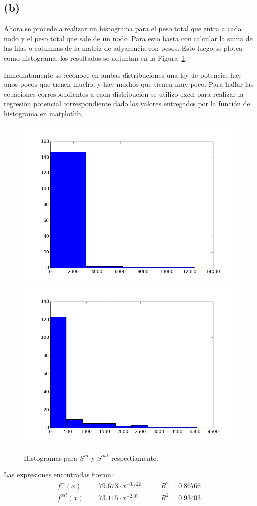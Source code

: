 \documentclass[letterpaper]{article}
\begin{document}
\subsection*{(b)}
Ahora se procede a realizar un histograma para el peso total que entra a cada nodo y el peso total que sale de un nodo. Para esto basta con calcular la suma de las filas o columnas de la matriz de adyacencia con pesos. Esto luego se plotea como histograma, los resultados se adjuntan en la Figura~\ref{chart:1}.

Inmediatamente se reconoce en ambas distribuciones una ley de potencia, hay unos pocos que tienen mucho, y hay muchos que tienen muy poco. Para hallar las ecuaciones correspondientes a cada distribución se utilizo excel para realizar la regresión potencial correspondiente dado los valores entregados por la función de histograma en matplotlib.

\begin{figure}[H]
  \centering
  \includegraphics[width=.49\linewidth]{img/p9-s-in.png}\hfill
  \includegraphics[width=.49\linewidth]{img/p9-s-out.png}\hfill
  \caption{Histogramas para $S^{in}$ y $S^{out}$ respectiamente.}
  \label{chart:1}
\end{figure}
Las expresiones encontradas fueron:
\begin{align}
  f^{in}(x)  &= 79.673\cdot x^{-3.722} & \qquad R^2 = 0.86766 \\
  f^{out}(x) &= 73.115\cdot x^{-2.07}  & \qquad R^2 = 0.93403
\end{align}
\end{document}

